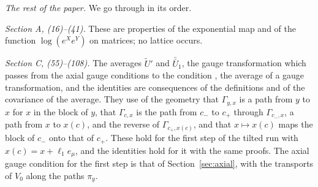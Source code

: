 \documentclass[11pt]{preprint}
\numberwithin{equation}{section}
\theoremstyle{definition}
\theoremstyle{remark}
\theoremstyle{plain}
\begin{document}
\emph{The rest of the paper.} We go through \cite{BalabanAVG} in its order.

\emph{Section A, (16)--(41).} These are properties of the exponential map and of the function $\log(e^Xe^Y)$ on matrices; no lattice occurs.

\emph{Section C, (55)--(108).} The averages $\tilde U'$ and $\bar{\bar U}_1$, the gauge transformation \cite[(62)]{BalabanAVG} which passes from the axial gauge conditions \cite[(58)]{BalabanAVG} to the condition \cite[(61)]{BalabanAVG}, the average \cite[(78)]{BalabanAVG} of a gauge transformation, and the identities \cite[(63), (88), (92), (97), (99), (104)--(108)]{BalabanAVG} are consequences of the definitions and of the covariance of the average. They use of the geometry that $\Gamma_{y,x}$ is a path from $y$ to $x$ for $x$ in the block of $y$, that $\Gamma_{c,x}$ is the path from $c_-$ to $c_+$ through $\Gamma_{c_-,x}$, a path from $x$ to $x(c)$, and the reverse of $\Gamma_{c_+,x(c)}$, and that $x \mapsto x(c)$ maps the block of $c_-$ onto that of $c_+$. These hold for the first step of the tilted run with $x(c) = x + \ell_1e_\mu$, and the identities hold for it with the same proofs. The axial gauge condition \cite[(58)]{BalabanAVG} for the first step is that of Section~\ref{sec:axial}, with the transports of $V_0$ along the paths $\pi_y$.
\end{document}
